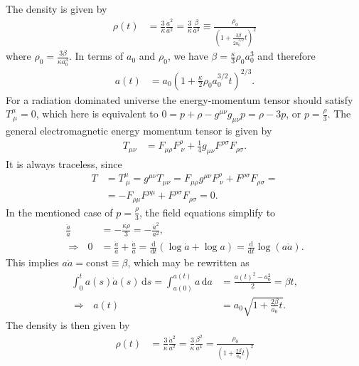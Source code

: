 \documentclass[english, parskip=full]{scrartcl}
\newcommand{\intx}{}
\newcommand{\kla}{}
\newcommand{\tecxt}{}
\begin{document}
The density is given by
\begin{align}
\rho(t) &= \frac{3}{\kappa} \frac{\dot{a}^2}{a^2} = \frac{3}{\kappa} \frac{\beta}{a^3} \equiv \frac{\rho_0}{\kla\left( 1 + \frac{3\beta}{2a_0^{3/2}}t \right)^2}
\end{align}
where $\rho_0 = \frac{3\beta}{\kappa a_0^3}$.
In terms of $a_0$ and $\rho_0$, we have $\beta= \frac{\kappa}{3}\rho_0 a_0^3$ and therefore
\begin{align}
a(t) &= a_0 \kla\left( 1 + \frac{\kappa}{2} \rho_0a_0^{3/2}t \right)^{2/3}.
\end{align}
For a radiation dominated universe the energy-momentum tensor should satisfy $T^\mu_{\ \mu} = 0$, which here is equivalent to $0 = p+\rho - g^{\mu\nu}g_{\mu\nu}p = \rho - 3p$, or $p = \frac{\rho}{3}$.
The general electromagnetic energy momentum tensor is given by
\begin{align}
T_{\mu\nu} &= F_{\mu\rho}F^\rho_{\ \nu} + \frac{1}{4}g_{\mu\nu} F^{\rho\sigma} F_{\rho\sigma}.
\end{align}
It is always traceless, since
\begin{align}
T &= T^{\mu}_{\ \mu} = g^{\mu\nu}T_{\mu\nu} = F_{\mu \rho} g^{\mu\nu} F^\rho_{\ \nu} + F^{\rho\sigma} F_{\rho\sigma} = \\
&= -F_{\rho\mu} F^{\rho\mu} + F^{\rho\sigma} F_{\rho\sigma} = 0.
\end{align}
In the mentioned case of $p=\frac{\rho}{3}$, the field equations simplify to
\begin{align}
\frac{\ddot{a}}{a} &= -\frac{\kappa\rho}{3} = -\frac{\dot{a}^2}{a^2},\\
\Rightarrow\ \ \ 0 &= \frac{\ddot{a}}{\dot{a}} + \frac{\dot{a}}{a} = \frac{\tecxt\text{d}}{\tecxt\text{d}t} \kla\left( \log\dot{a} + \log a \right) = \frac{\tecxt\text{d}}{\tecxt\text{d}t} \log (a\dot{a}).
\end{align}
This implies $a\dot{a} = \tecxt\text{const} \equiv \beta$, which may be rewritten as
\begin{align}
\intx\int_{0}^{t}a(s)\dot{a}(s)\, \mathrm{d}s = \intx\int_{a(0)}^{a(t)} a\, \mathrm{d}a &= \frac{a(t)^2 - a_0^2}{2} = \beta t,\\
\Rightarrow\ \ \ a(t) &= a_0 \sqrt{1 + \frac{2\beta}{a_0}t}.
\end{align}
The density is then given by
\begin{align}
\rho(t) &= \frac{3}{\kappa} \frac{\dot{a}^2}{a^2} = \frac{3}{\kappa} \frac{\beta^2}{a^4} = \frac{\rho_0}{\kla\left( 1 + \frac{2\beta}{a_0}t \right)^2}
\end{align}
\end{document}
